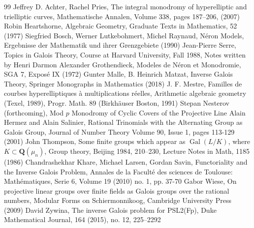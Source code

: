 \documentclass{article}
\theoremstyle{definition}
\DeclareMathOperator{\Gal}{\mathrm{Gal}}
\begin{document}
	\begin{thebibliography}{99}
		 Jeffrey D. Achter, Rachel Pries, The integral monodromy of hyperelliptic and trielliptic
		curves, Mathematische Annalen, Volume 338, pages 187–206, (2007)
		 Robin Heartshorne, Algebraic Geometry, Graduate Texts in Mathematics, 52 (1977)
		 Siegfried Bosch, Werner Lutkebohmert, Michel Raynaud, N\'eron Models, Ergebnisse der Mathematik und ihrer Grenzgebiete (1990)
		 Jean-Pierre Serre, Topics in Galois Theory, Course at Harvard University, Fall 1988, Notes written by Henri Darmon
		 Alexander Grothendieck, Modeles de N\'eron et Monodromie, SGA 7, Expos\'e IX (1972)
		 Gunter Malle, B. Heinrich Matzat, Inverse Galois Theory, Springer Monographs in Mathematics (2018)
		 J. F. Mestre, Familles de courbes hyperelliptiques à multiplications réelles, Arithmetic algebraic geometry (Texel, 1989), Progr. Math. 89 (Birkhäuser Boston, 1991)
		 Stepan Nesterov (forthcoming), Mod $p$ Monodromy of Cyclic Covers of the Projective Line
		 Alain Hermez and Alain Salinier, Rational Trinomials with the Alternating Group
		as Galois Group, Journal of Number Theory Volume 90, Issue 1, pages 113-129 (2001)
		 John Thompson, Some finite groups which appear as $\Gal(L/K)$, where $K \subset \mathbf{Q}(\mu_n)$, Group theory, Beijing 1984, 210–230, Lecture Notes in Math, 1185 (1986)
		 Chandrashekhar Khare, Michael Larsen, Gordan Savin, Functoriality and the Inverse Galois Problem, Annales de la Faculté des sciences de Toulouse: Mathématiques, Serie 6, Volume 19 (2010) no. 1, pp. 37-70
		 Gabor Wiese, On projective linear groups over finite fields as Galois groups
		over the rational numbers, Modular Forms on Schiermonnikoog, Cambridge University Press (2009)
		 David Zywina, The inverse Galois problem for PSL2(Fp), Duke Mathematical Journal, 164 (2015), no. 12, 225–2292 
	\end{thebibliography}
	
\end{document}
